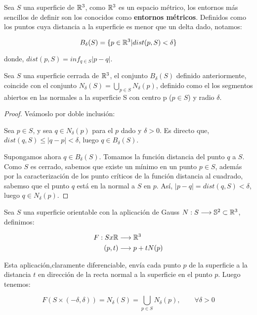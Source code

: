 Sea $S$ una superficie de $\mathbb{R}^3$, como $\mathbb{R}^3$ es un espacio métrico, los entornos más sencillos de definir son los conocidos como \textbf{entornos métricos}. Definidos como los puntos cuya distancia a la superficie es menor que un delta dado, notamos:

\begin{equation*}
    B_\delta(S)=\{p\in \mathbb{R}^3 | dist(p,S) < \delta\}
\end{equation*}

donde, $dist(p,S) = inf_{q\in S}|p-q|$.

\begin{lemma}
Sea $S$ una superficie cerrada de $\mathbb{R}^3$, el conjunto $B_\delta(S)$ definido anteriormente, coincide con el conjunto $N_\delta(S)=\bigcup_{p\in S}N_\delta(p)$, definido como el los segmentos abiertos en las normales a la superficie S con centro p ($p \in S$) y radio $\delta$.
\end{lemma}
\begin{proof}
Veámoslo por doble inclusión:

Sea $p \in S$, y sea $q \in N_\delta(p)$ para el $p$ dado y $\delta > 0$. Es directo que, $dist(q,S) \leq |q-p| < \delta$, luego $q \in B_\delta(S)$.

Supongamos ahora $q \in B_\delta(S)$. Tomamos la función distancia del punto $q$ a $S$. Como $S$ es cerrado, sabemos que existe un mínimo en un punto $p \in S$, además por la caracterización de los punto críticos de la función distancia al cuadrado, sabemso que el punto $q$ está en la normal a $S$ en $p$. Así, $|p-q| = dist(q,S) < \delta$, luego $q \in N_\delta(p)$.
\end{proof}

Sea $S$ una superficie orientable con la aplicación de Gauss $N: S \longrightarrow \mathbb{S}^2 \subset \mathbb{R}^3$, definimos:

\begin{align*}
    F: S x \mathbb{R} &\longrightarrow \mathbb{R}^3 \\
    (p,t) &\longrightarrow p + tN(p)
\end{align*}

Esta aplicación,claramente diferenciable, envía cada punto $p$ de la superficie a la distancia $t$ en dirección de la recta normal a la superficie en el punto $p$. Luego tenemos:

\begin{equation*}
    F(S \times (-\delta, \delta)) = N_\delta(S)=\bigcup_{p\in S} N_\delta(p), \qquad \forall \delta > 0
\end{equation*}

